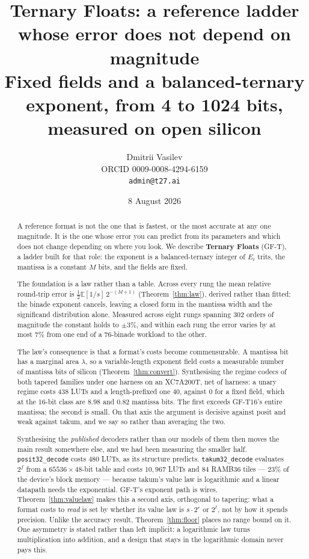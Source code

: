 \documentclass[11pt]{article}
\title{Ternary Floats: a reference ladder whose error does not depend on magnitude \\
  \large Fixed fields and a balanced-ternary exponent, from 4 to 1024 bits, measured on open silicon}
\author{Dmitrii Vasilev\\
  \small ORCID 0009-0008-4294-6159 \\
  \small \texttt{admin@t27.ai}}
\date{8 August 2026}
\theoremstyle{definition}
\begin{document}
\maketitle

\begin{abstract}
A reference format is not the one that is fastest, or the most accurate at any one
magnitude. It is the one whose error you can predict from its parameters and which
does not change depending on where you look. We describe \textbf{Ternary Floats}
(GF-T), a ladder built for that role: the exponent is a balanced-ternary integer of
$E_t$ trits, the mantissa is a constant $M$ bits, and the fields are fixed.

The foundation is a law rather than a table. Across every rung the mean relative
round-trip error is $\tfrac12\mathbb{E}[1/s]\,2^{-(M+1)}$
(Theorem~\ref{thm:law}), derived rather than fitted: the binade exponent cancels,
leaving a closed form in the mantissa width and the significand distribution
alone. Measured across eight rungs spanning 302 orders of magnitude the constant
holds to $\pm3\%$, and within each rung the error varies by at most $7\%$ from one
end of a 76-binade workload to the other.

The law's consequence is that a format's costs become commensurable. A mantissa
bit has a marginal area $\lambda$, so a variable-length exponent field costs a
measurable number of mantissa bits of silicon (Theorem~\ref{thm:convert}).
Synthesising the regime codecs of both tapered families under one harness on an
XC7A200T, net of harness: a unary regime costs $438$ LUTs and a length-prefixed
one $40$, against $0$ for a fixed field, which at the 16-bit class are $8.98$ and
$0.82$ mantissa bits. The first exceeds GF-T16's entire mantissa; the second is
small. On that axis the argument is decisive against posit and weak against takum,
and we say so rather than averaging the two.

Synthesising the \emph{published} decoders rather than our models of them then
moves the main result somewhere else, and we had been measuring the smaller half.
\texttt{posit32\_decode} costs $480$ LUTs, as its structure predicts.
\texttt{takum32\_decode} evaluates $2^{f}$ from a $65536\times 48$-bit table and
costs $10{,}967$ LUTs and $84$ RAMB36 tiles --- $23\%$ of the device's block
memory --- because takum's value law is logarithmic and a linear datapath needs
the exponential. GF-T's exponent path is wires. Theorem~\ref{thm:valuelaw} makes
this a second axis, orthogonal to tapering: what a format costs to \emph{read} is
set by whether its value law is $s\cdot 2^{e}$ or $2^{\ell}$, not by how it spends
precision. Unlike the accuracy result, Theorem~\ref{thm:floor} places no range
bound on it. One asymmetry is stated rather than left implicit: a logarithmic law
turns multiplication into addition, and a design that stays in the logarithmic
domain never pays this.


\end{abstract}
\end{document}
